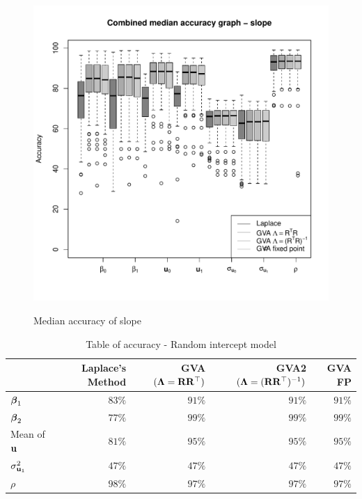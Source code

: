 \documentclass{article}[12pt]
\begin{document}
\begin{figure}
\caption{Median accuracy of slope}
\label{fig:median_accuracy_slope}
\includegraphics[width=120mm, height=120mm]{code/results/median_accuracy_combined_slope.pdf}
\end{figure}

\begin{table}
\caption{Table of accuracy - Random intercept model}
\label{tab:accuracy_int}
\begin{tabular}{|l|rrrr|}
\hline
& Laplace's Method & GVA $({\boldsymbol \Lambda} = {\bf R} {\bf R}^\top)$ & GVA2 $({\boldsymbol \Lambda} = ({\bf R} {\bf R}^\top)^{-1})$ & GVA FP\\
\hline
${\boldsymbol \beta}_1$ & $83\%$ & $91\%$ & $91\%$ & $91\%$ \\ 
${\boldsymbol \beta}_2$ & $77\%$ & $99\%$ & $99\%$ & $99\%$ \\ 
Mean of ${\bf u}$ & $81\%$ & $95\%$ & $95\%$ & $95\%$ \\
$\sigma^2_{{\bf u}_1}$ & $47\%$ & $47\%$ & $47\%$ & $47\%$ \\ 
$\rho$ & $98\%$ & $97\%$ & $97\%$ & $97\%$ \\ 
\hline
\end{tabular}
\end{table}
\end{document}
